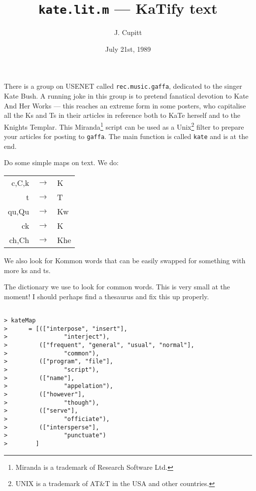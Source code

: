 \documentclass[10pt]{article}
\title{{\tt kate.lit.m} --- KaTify text}
\author{J. Cupitt}
\date{July 21st, 1989}
\begin{document}
\maketitle


There is a group on USENET called \verb"rec.music.gaffa", dedicated to the
singer Kate Bush. A running joke in this group is to pretend fanatical
devotion to Kate And Her Works --- this reaches an extreme form in some
posters, who capitalise all the Ks and Ts in their articles in reference both
to KaTe herself and to the Knights Templar. This Miranda\footnote{Miranda is a 
trademark of Research Software Ltd.} script can be used as a {\sc 
Unix}\footnote{UNIX is a trademark of AT\&T in the USA and other
countries.} filter to prepare your articles for posting to \verb"gaffa".
The main function is called \verb"kate" and is at the end.

Do some simple maps on text. We do:

\begin{center}
\begin{tabular}{rcl}
        c,C,k & $\rightarrow $ & K \\
        t & $\rightarrow $ & T \\
        qu,Qu & $\rightarrow $ & Kw \\
        ck & $\rightarrow $ & K \\
        ch,Ch & $\rightarrow $ & Khe
\end{tabular}
\end{center}

We also look for Kommon words that can be easily swapped for something with
more ks and ts. 

The dictionary we use to look for common words. This is very small at the
moment! I should perhaps find a thesaurus and fix this up properly.

\begin{verbatim}

> kateMap
>      = [(["interpose", "insert"],
>                "interject"),
>         (["frequent", "general", "usual", "normal"],
>                "common"),
>         (["program", "file"],
>                "script"),
>         (["name"],
>                "appelation"),
>         (["however"],
>                "though"),
>         (["serve"],
>                "officiate"),
>         (["intersperse"],
>                "punctuate")
>        ]

\end{verbatim}
\end{document}
